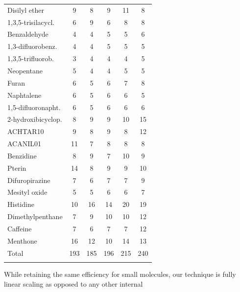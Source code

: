 \documentclass[prl,aps,twocolumn,showpacs,twocolumngrid,superbib]{revtex4}
\begin{document}
\begin{table}[h]
\begin{tabular}{lccccc}
Disilyl ether          &   9    &   8    &    9    &   11   &   8     \\
1,3,5-trisilacycl.     &   6    &   9    &    6    &    8   &   8     \\
Benzaldehyde           &   4    &   4    &    5    &    5   &   6     \\
1,3-difluorobenz.      &   4    &   4    &    5    &    5   &   5     \\
1,3,5-trifluorob.      &   3    &   4    &    4    &    4   &   5     \\
Neopentane             &   5    &   4    &    4    &    5   &   5     \\
Furan                  &   6    &   5    &    6    &    7   &   8     \\
Naphtalene             &   6    &   5    &    6    &    6   &   5     \\
1,5-difluoronapht.     &   6    &   5    &    6    &    6   &   6     \\
2-hydroxibicyclop.     &   8    &   9    &    9    &   10   &  15     \\
ACHTAR10               &   9    &   8    &    9    &    8   &  12     \\
ACANIL01               &  11    &   7    &    8    &    8   &   8     \\
Benzidine              &   8    &   9    &    7    &   10   &   9     \\
Pterin                 &  14    &   8    &    9    &    9   &  10     \\
Difuropirazine         &   7    &   6    &    7    &    7   &   9     \\
Mesityl oxide          &   5    &   5    &    6    &    6   &   7     \\
Histidine              &  10    &  16    &   14    &   20   &  19     \\
Dimethylpenthane       &   7    &   9    &   10    &   10   &  12     \\
Caffeine               &   7    &   6    &    7    &    7   &  12     \\
Menthone               &  16    &  12    &   10    &   14   &  13     \\
\colrule
Total                  & 193    & 185    &  196    &  215   & 240     \\
\botrule
\end{tabular}
\end{table}
While retaining the same efficiency for small molecules, our technique
is fully linear scaling as opposed to any other internal 
\end{document}
